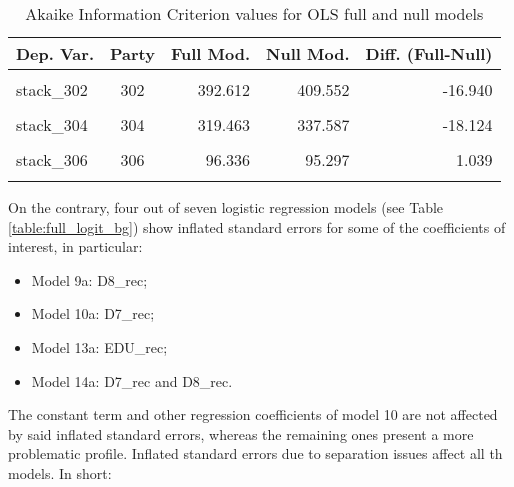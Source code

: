 \documentclass[
]{article}
\providecommand{\tightlist}{%
  \setlength{\itemsep}{0pt}\setlength{\parskip}{0pt}}
\begin{document}
\begin{table}[!h]

\caption{\label{tab:unnamed-chunk-18}Akaike Information Criterion values for OLS full and null models 
        \label{table:ols_aic_bg}}
\centering
\begin{tabular}[t]{lcrrr}
\toprule
Dep. Var. & Party & Full Mod. & Null Mod. & Diff. (Full-Null)\\
\midrule
\cellcolor{gray!6}{stack\_301} & \cellcolor{gray!6}{301} & \cellcolor{gray!6}{784.128} & \cellcolor{gray!6}{794.234} & \cellcolor{gray!6}{-10.106}\\
stack\_302 & 302 & 392.612 & 409.552 & -16.940\\
\cellcolor{gray!6}{stack\_303} & \cellcolor{gray!6}{303} & \cellcolor{gray!6}{-348.802} & \cellcolor{gray!6}{-325.216} & \cellcolor{gray!6}{-23.586}\\
stack\_304 & 304 & 319.463 & 337.587 & -18.124\\
\cellcolor{gray!6}{stack\_305} & \cellcolor{gray!6}{305} & \cellcolor{gray!6}{337.528} & \cellcolor{gray!6}{342.058} & \cellcolor{gray!6}{-4.531}\\
\addlinespace
stack\_306 & 306 & 96.336 & 95.297 & 1.039\\
\cellcolor{gray!6}{stack\_307} & \cellcolor{gray!6}{307} & \cellcolor{gray!6}{-185.834} & \cellcolor{gray!6}{-178.896} & \cellcolor{gray!6}{-6.938}\\
\bottomrule
\end{tabular}
\end{table}

On the contrary, four out of seven logistic regression models (see Table \ref{table:full_logit_bg}) show
inflated standard errors for some of the coefficients of interest, in particular:

\begin{itemize}
\tightlist
\item
  Model 9a: D8\_rec;
\item
  Model 10a: D7\_rec;
\item
  Model 13a: EDU\_rec;
\item
  Model 14a: D7\_rec and D8\_rec.
\end{itemize}

The constant term and other regression coefficients of model 10 are not affected by said inflated standard errors, whereas the remaining ones present a more problematic profile.
Inflated standard errors due to separation issues affect all th models. In short:
\end{document}
